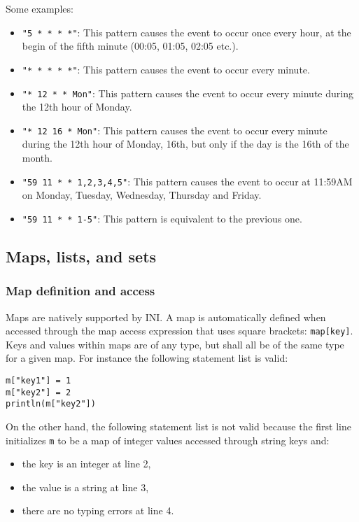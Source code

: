 \documentclass[11pt]{article}
\begin{document}
Some examples:

\begin{itemize}
\item \texttt{"5 * * * *"}: This pattern causes the event to occur once every hour, at the begin of the fifth minute (00:05, 01:05, 02:05 etc.).
\item \texttt{"* * * * *"}: This pattern causes the event to occur every minute.
\item \texttt{"* 12 * * Mon"}: This pattern causes the event to occur every minute during the 12th hour of Monday.
\item \texttt{"* 12 16 * Mon"}: This pattern causes the event to occur every minute during the 12th hour of Monday, 16th, but only if the day is the 16th of the month.
\item \texttt{"59 11 * * 1,2,3,4,5"}: This pattern causes the event to occur at 11:59AM on Monday, Tuesday, Wednesday, Thursday and Friday.
\item \texttt{"59 11 * * 1-5"}: This pattern is equivalent to the previous one.
\end{itemize}

\subsection{Maps, lists, and sets}

\subsubsection{Map definition and access}

Maps are natively supported by INI. A map is automatically defined when accessed through the map access expression that uses square brackets: \texttt{map[key]}. Keys and values within maps are of any type, but shall all be of the same type for a given map. For instance the following statement list is valid:

\begin{lstlisting}[numbers=none]
m["key1"] = 1
m["key2"] = 2
println(m["key2"])
\end{lstlisting}

On the other hand, the following statement list is not valid because the first line initializes \texttt{m} to be a map of integer values accessed through string keys and:

\begin{itemize}
\item the key is an integer at line 2,
\item the value is a string at line 3,
\item there are no typing errors at line 4.
\end{itemize}
\end{document}
